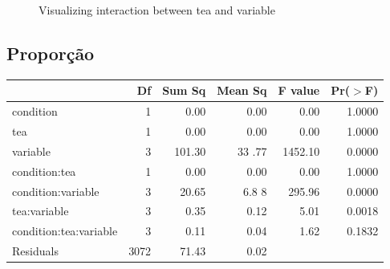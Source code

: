 \documentclass{article}
\begin{document}
\begin{figure}[H]
  \caption{Visualizing interaction between tea and variable}
  \noindent{}
  \centering
\end{figure}


\subsection{Proporção}

\begin{table}[ht]
\centering
\begin{tabular}{lrrrrr}
  \hline
 & Df & Sum Sq & Mean Sq & F value & Pr($>
$F) \\ 
  \hline
condition              & 1 & 0.00 & 0.00 &
 0.00 & 1.0000 \\ 
  tea                    & 1 & 0.00 & 0.00
 & 0.00 & 1.0000 \\ 
  variable               & 3 & 101.30 & 33
.77 & 1452.10 & 0.0000 \\ 
  condition:tea          & 1 & 0.00 & 0.00
 & 0.00 & 1.0000 \\ 
  condition:variable     & 3 & 20.65 & 6.8
8 & 295.96 & 0.0000 \\ 
  tea:variable           & 3 & 0.35 & 0.12
 & 5.01 & 0.0018 \\ 
  condition:tea:variable & 3 & 0.11 & 0.04
 & 1.62 & 0.1832 \\ 
  Residuals              & 3072 & 71.43 & 
0.02 &  &  \\ 
   \hline
\end{tabular}
\end{table}
\end{document}
